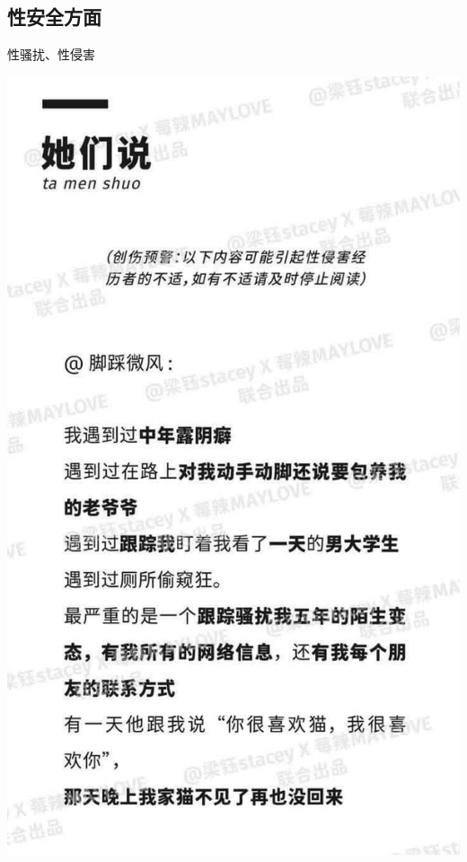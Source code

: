 \subsection{性安全方面}
\begin{frame}{性骚扰、性侵害}
    \begin{block}{}
        \includegraphics[height=.55\textheight]{../docs/img/3-4.jpg}

\end{block}
\end{frame}
